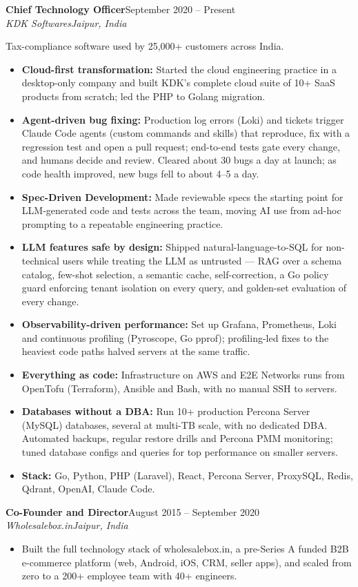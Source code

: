 \documentclass[a4paper,10pt]{article}
\newcommand{\resrole}[4]{%
  {\color{accent}\bfseries #1}\hfill{\color{muted}#2}\\%
  {\itshape #3}\hfill{\color{muted}\itshape #4}\par\vspace{1pt}%
}
\newcommand{\resgap}{\vspace{6pt}}
\begin{document}
\resrole{Chief Technology Officer}{September 2020 -- Present}{KDK Softwares}{Jaipur, India}
Tax-compliance software used by 25,000+ customers across India.
\begin{itemize}
  \item \textbf{Cloud-first transformation:} Started the cloud engineering practice in a desktop-only company and built KDK's complete cloud suite of 10+ SaaS products from scratch; led the PHP to Golang migration.
  \item \textbf{Agent-driven bug fixing:} Production log errors (Loki) and tickets trigger Claude Code agents (custom commands and skills) that reproduce, fix with a regression test and open a pull request; end-to-end tests gate every change, and humans decide and review. Cleared about 30 bugs a day at launch; as code health improved, new bugs fell to about 4--5 a day.
  \item \textbf{Spec-Driven Development:} Made reviewable specs the starting point for LLM-generated code and tests across the team, moving AI use from ad-hoc prompting to a repeatable engineering practice.
  \item \textbf{LLM features safe by design:} Shipped natural-language-to-SQL for non-technical users while treating the LLM as untrusted --- RAG over a schema catalog, few-shot selection, a semantic cache, self-correction, a Go policy guard enforcing tenant isolation on every query, and golden-set evaluation of every change.
  \item \textbf{Observability-driven performance:} Set up Grafana, Prometheus, Loki and continuous profiling (Pyroscope, Go pprof); profiling-led fixes to the heaviest code paths halved servers at the same traffic.
  \item \textbf{Everything as code:} Infrastructure on AWS and E2E Networks runs from OpenTofu (Terraform), Ansible and Bash, with no manual SSH to servers.
  \item \textbf{Databases without a DBA:} Run 10+ production Percona Server (MySQL) databases, several at multi-TB scale, with no dedicated DBA. Automated backups, regular restore drills and Percona PMM monitoring; tuned database configs and queries for top performance on smaller servers.
  \item \textbf{Stack:} Go, Python, PHP (Laravel), React, Percona Server, ProxySQL, Redis, Qdrant, OpenAI, Claude Code.
\end{itemize}
\resgap

\resrole{Co-Founder and Director}{August 2015 -- September 2020}{Wholesalebox.in}{Jaipur, India}
\begin{itemize}
  \item Built the full technology stack of wholesalebox.in, a pre-Series A funded B2B e-commerce platform (web, Android, iOS, CRM, seller apps), and scaled from zero to a 200+ employee team with 40+ engineers.
\end{itemize}
\resgap
\end{document}
